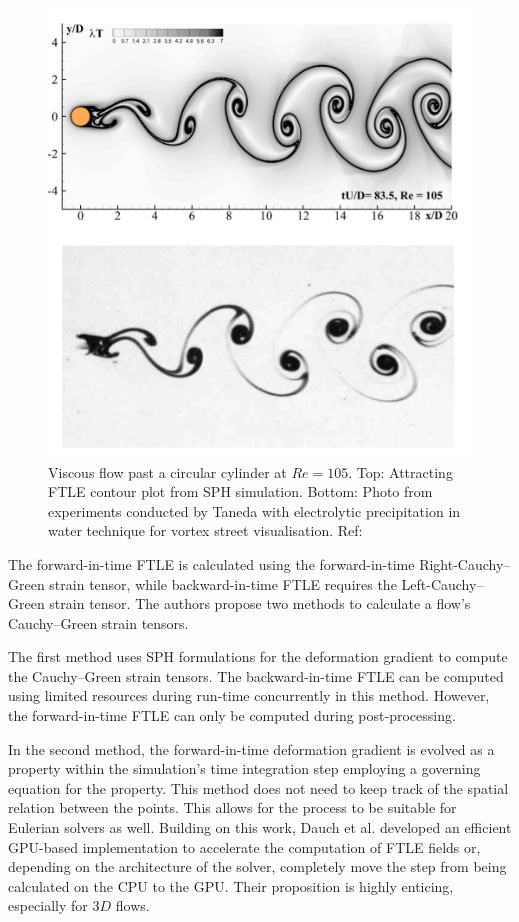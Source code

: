 \begin{figure}[h!]
    \centering
    \includegraphics{Figures/research_papers/sun2016detection-fig-1.png}
    \caption{Viscous flow past a circular cylinder at $Re = 105$. Top: Attracting FTLE contour plot from SPH simulation. Bottom: Photo from experiments conducted by Taneda \parencite{taneda1977visual} with electrolytic precipitation in water technique for vortex street visualisation. Ref: \parencite{sun2016detection}}
    \label{fig:sun2016detection-fig-1}
\end{figure}

The forward-in-time FTLE is calculated using the forward-in-time Right-Cauchy–Green strain tensor, while backward-in-time FTLE requires the Left-Cauchy–Green strain tensor.
The authors propose two methods to calculate a flow's Cauchy–Green strain tensors.

The first method uses SPH formulations for the deformation gradient to compute the Cauchy–Green strain tensors. The backward-in-time FTLE can be computed using limited resources during run-time concurrently in this method. However, the forward-in-time FTLE can only be computed during post-processing.

In the second method, the forward-in-time deformation gradient is evolved as a property within the simulation's time integration step employing a governing equation for the property. This method does not need to keep track of the spatial relation between the points. This allows for the process to be suitable for Eulerian solvers as well.
Building on this work, Dauch et al. \parencite{dauch2018highly} developed an efficient GPU-based implementation to accelerate the computation of FTLE fields or, depending on the architecture of the solver, completely move the step from being calculated on the CPU to the GPU. Their proposition is highly enticing, especially for $3D$ flows.

